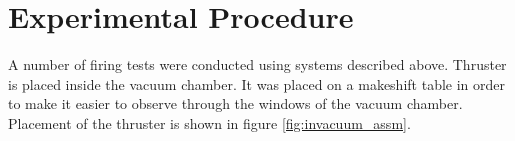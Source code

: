 







\newpage
\section{Experimental Procedure}
A number of firing tests were conducted using systems described above. Thruster is placed inside the vacuum chamber. It was placed on a makeshift table in order to make it easier to observe through the windows of the vacuum chamber. Placement of the thruster is shown in figure \ref{fig:invacuum_assm}.

